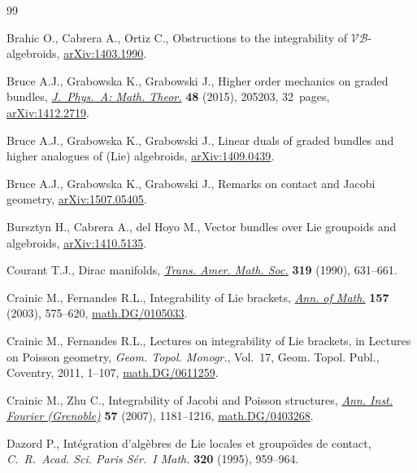\begin{thebibliography}{99}
\footnotesize\itemsep=0pt

Brahic O., Cabrera A., Ortiz C., Obstructions to the integrability of
  $\mathcal{VB}$-algebroids, \href{http://arxiv.org/abs/1403.1990}{arXiv:1403.1990}.


Bruce A.J., Grabowska K., Grabowski J., Higher order mechanics on graded
  bundles, \href{http://dx.doi.org/10.1088/1751-8113/48/20/205203}{\textit{J.~Phys.~A: Math. Theor.}} \textbf{48} (2015), 205203,
  32~pages, \href{http://arxiv.org/abs/1412.2719}{arXiv:1412.2719}.


Bruce A.J., Grabowska K., Grabowski J., Linear duals of graded bundles and
  higher analogues of (Lie) algebroids, \href{http://arxiv.org/abs/1409.0439}{arXiv:1409.0439}.

Bruce A.J., Grabowska K., Grabowski J., Remarks on contact and Jacobi geometry,
  \href{http://arxiv.org/abs/1507.05405}{arXiv:1507.05405}.

Bursztyn H., Cabrera A., del Hoyo M., Vector bundles over Lie groupoids and
  algebroids, \href{http://arxiv.org/abs/1410.5135}{arXiv:1410.5135}.

Courant T.J., Dirac manifolds, \href{http://dx.doi.org/10.2307/2001258}{\textit{Trans. Amer. Math. Soc.}} \textbf{319}
  (1990), 631--661.

Crainic M., Fernandes R.L., Integrability of {L}ie brackets, \href{http://dx.doi.org/10.4007/annals.2003.157.575}{\textit{Ann. of
  Math.}} \textbf{157} (2003), 575--620, \href{http://arxiv.org/abs/math.DG/0105033}{math.DG/0105033}.

Crainic M., Fernandes R.L., Lectures on integrability of {L}ie brackets, in
  Lectures on {P}oisson geometry, \textit{Geom. Topol. Monogr.}, Vol.~17, Geom.
  Topol. Publ., Coventry, 2011, 1--107, \href{http://arxiv.org/abs/math.DG/0611259}{math.DG/0611259}.

Crainic M., Zhu C., Integrability of {J}acobi and {P}oisson structures,
  \href{http://dx.doi.org/10.5802/aif.2291}{\textit{Ann. Inst. Fourier (Grenoble)}} \textbf{57} (2007), 1181--1216,
  \href{http://arxiv.org/abs/math.DG/0403268}{math.DG/0403268}.

Dazord P., Int\'egration d'alg\`ebres de {L}ie locales et groupo\"\i des de
  contact, \textit{C.~R.~Acad. Sci. Paris S\'er.~I Math.} \textbf{320} (1995),
  959--964.


\end{thebibliography}

